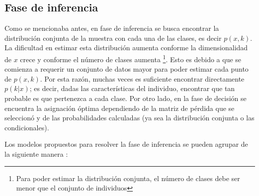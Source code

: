 \subsection{Fase de inferencia}
Como se mencionaba antes, en fase de inferencia se busca encontrar la distribución conjunta de la muestra con cada una de las clases, es decir $p(x,k)$. La dificultad en estimar esta distribución aumenta conforme la dimensionalidad de $x$ crece y conforme el número de clases aumenta \footnote{Para poder estimar la distribución conjunta, el número de clases debe ser menor que el conjunto de individuos}. Esto es debido a que se comienza a requerir un conjunto de datos mayor para poder estimar cada punto de $p(x,k)$. Por esta razón, muchas veces es suficiente encontrar directamente $p(k|x)$; es decir, dadas las características del individuo, encontrar que tan probable es que pertenezca a cada clase. Por otro lado, en la fase de decisión se encuentra la asignación óptima dependiendo de la matriz de pérdida que se seleccionó y de las probabilidades calculadas (ya sea la distribución conjunta o las condicionales). 

Los modelos propuestos para resolver la fase de inferencia se pueden agrupar de la siguiente manera \cite{bishop2006pattern}: 

